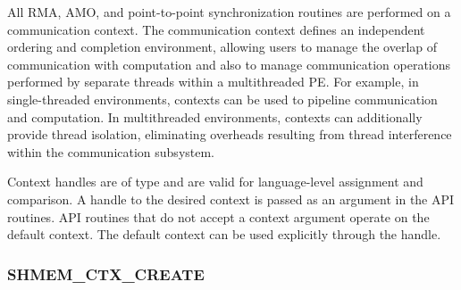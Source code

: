 \color{ForestGreen}

All \openshmem RMA, AMO, and point-to-point synchronization routines are
performed on a communication context.  The communication context defines an
independent ordering and completion environment, allowing users to manage the
overlap of communication with computation and also to manage communication
operations performed by separate threads within a multithreaded \ac{PE}.  For
example, in single-threaded environments, contexts can be used to pipeline
communication and computation.  In multithreaded environments, contexts can
additionally provide thread isolation, eliminating overheads resulting from
thread interference within the communication subsystem.

Context handles are of type  and are valid for
language-level assignment and comparison.  A handle to the desired context is
passed as an argument in the  API routines.  API routines
that do not accept a context argument operate on the default context.  The
default context can be used explicitly through the 
handle.

\subsubsection{\textbf{SHMEM\_CTX\_CREATE}}
\label{subsec:shmem_ctx_create}

